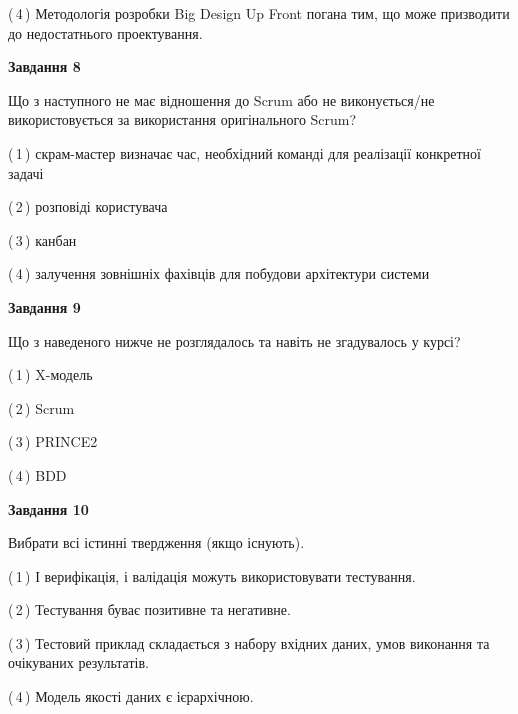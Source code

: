 \documentclass[10pt, ukrainian]{article}
\begin{document}
{\begin {large}
(\,4\,) Методологія розробки Big Design Up Front погана тим, що може призводити до недостатнього проектування.%


{\begin {center}\textbf{Завдання 8}\end {center}}\par
Що з наступного не має відношення до Scrum або не виконується/не використовується за використання оригінального Scrum?\par
\vspace{2mm}



(\,1\,) скрам-мастер визначає час, необхідний команді для реалізації конкретної задачі%



(\,2\,) розповіді користувача%



(\,3\,) канбан%



(\,4\,) залучення зовнішніх фахівців для побудови архітектури системи%


{\begin {center}\textbf{Завдання 9}\end {center}}\par
Що з наведеного нижче не розглядалось та навіть не згадувалось у курсі?\par
\vspace{2mm}



(\,1\,) X-модель%



(\,2\,) Scrum%



(\,3\,) PRINCE2%



(\,4\,) BDD%


{\begin {center}\textbf{Завдання 10}\end {center}}\par
Вибрати всі істинні твердження (якщо існують).\par
\vspace{2mm}



(\,1\,) І верифікація, і валідація можуть використовувати тестування.%



(\,2\,) Тестування буває позитивне та негативне.%



(\,3\,) Тестовий приклад складається з набору вхідних даних, умов виконання та очікуваних результатів.%



(\,4\,) Модель якості даних є ієрархічною.%



\end {large}}
\end{document}
